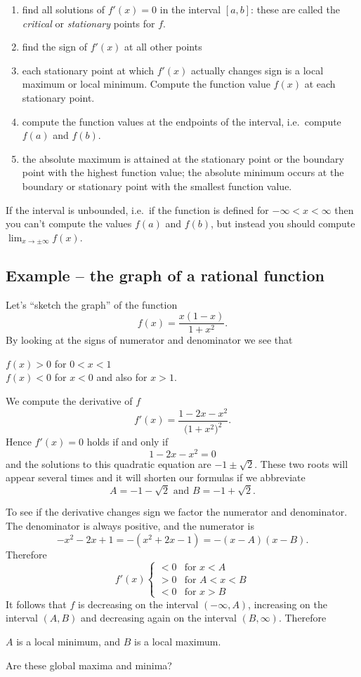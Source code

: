 \begin{enumerate}
\item find all solutions of $f'(x)=0$ in the interval $[a,b]$: these are called
  the \textit{critical} or \textit{stationary} points for $f$.
\item find the sign of $f'(x)$ at all other points
\item each stationary point at which $f'(x)$ actually changes sign is a local
  maximum or local minimum.  Compute the function value $f(x)$ at each
  stationary point.
\item compute the function values at the endpoints of the interval, i.e.\
  compute $f(a)$ and $f(b)$.
\item the absolute maximum is attained at the stationary point or the boundary
  point with the highest function value; the absolute minimum occurs at the
  boundary or stationary point with the smallest function value.
\end{enumerate}
If the interval is unbounded, i.e.\ if the function is defined for
$-\infty<x<\infty$ then you can't compute the values $f(a)$ and $f(b)$, but
instead you should compute $\lim_{x\to\pm\infty}f(x)$.

\subsection{Example -- the graph of a rational function}
Let's ``sketch the graph'' of the function
\[
f(x) = \frac{x(1-x)}{1+x^2}.
\]
By looking at the signs of numerator and denominator we see that
\begin{center}
  $f(x)>0$ for $0<x<1$\\[2pt]
  $f(x)<0$ for $x<0$ and also for $x>1$.
\end{center}
We compute the derivative of $f$
\[
f'(x) = \frac{1-2x-x^2}{\bigl(1+x^2\bigr)^2}.
\]
Hence $f'(x) = 0$ holds if and only if
\[
1-2x-x^2 = 0
\]
and the solutions to this quadratic equation are $-1\pm\surd 2$.  These two
roots will appear several times and it will shorten our formulas if we
abbreviate
\[
A= -1 - \surd2 \text{ and } B= -1+\surd2 .
\]

To see if the derivative changes sign we factor the numerator and denominator.
The denominator is always positive, and the numerator is
\[
-x^2-2x+1 = -(x^2+2x-1) =-(x-A)(x-B).
\]
Therefore
\[
f'(x)
\begin{cases}
  <0 & \text{for }x<A \\
  >0 &\text{for } A<x<B \\
  <0 &\text{for } x>B
\end{cases}
\]\marginpar{\sffamily\footnotesize%
}%
It follows that $f$ is decreasing on the interval $(-\infty, A)$, increasing on
the interval $(A, B)$ and decreasing again on the interval $(B, \infty)$.
Therefore
\begin{center}
  $A$ is a local minimum, and $B$ is a local maximum.
\end{center}
Are these global maxima and minima?

